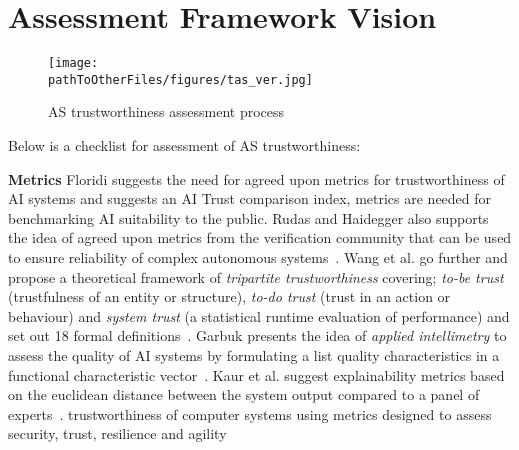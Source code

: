 










\section{Assessment Framework Vision}\label{Assessment_Framework_Vision}

\begin{figure*}[]
    \centering
    \texttt{[image: \\pathToOtherFiles/figures/tas\_ver.jpg]}
    \caption{AS trustworthiness assessment process}
    \label{fig:tas_ver}
\end{figure*}

Below is a checklist for assessment of AS trustworthiness:


\noindent\textbf{Metrics}
Floridi suggests the need for agreed upon metrics for trustworthiness of AI systems and suggests an  AI Trust comparison index, metrics are needed for benchmarking AI suitability to the public. 
%
Rudas and Haidegger also supports the idea of agreed upon metrics from the verification community that can be used to ensure reliability of complex autonomous systems~\cite{Rudas2020}. Wang et al. go further and propose a  theoretical framework of \emph{tripartite trustworthiness} covering; \emph{to-be trust} (trustfulness of an entity or structure), \emph{to-do trust} (trust in an action or behaviour) and \emph{system trust} (a statistical runtime evaluation of performance) and set out 18 formal definitions~\cite{Wang2020}. 
%
Garbuk presents the idea of \emph{applied intellimetry} to assess the quality of AI systems by formulating a list quality characteristics in a functional characteristic vector~\cite{garbuk2018intellimetry}. 
%
Kaur et al. suggest explainability metrics based on the euclidean distance between the system output compared to a panel of experts~\cite{kaur2021trustworthy}. 
%
trustworthiness of computer systems using metrics designed to assess security, trust, resilience and agility~\cite{cho2019stram}

